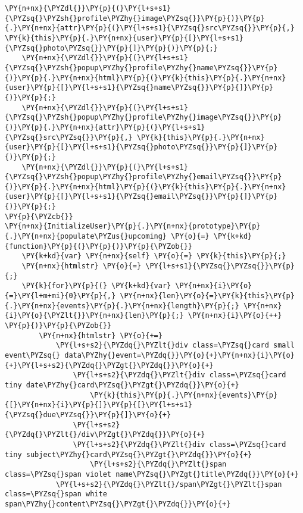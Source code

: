 \begin{Verbatim}[commandchars=\\\{\}]
    \PY{n+nx}{\PYZdl{}}\PY{p}{(}\PY{l+s+s1}{\PYZsq{}\PYZsh{}profile\PYZhy{}image\PYZsq{}}\PY{p}{)}\PY{p}{.}\PY{n+nx}{attr}\PY{p}{(}\PY{l+s+s1}{\PYZsq{}src\PYZsq{}}\PY{p}{,} \PY{k}{this}\PY{p}{.}\PY{n+nx}{user}\PY{p}{[}\PY{l+s+s1}{\PYZsq{}photo\PYZsq{}}\PY{p}{]}\PY{p}{)}\PY{p}{;}
    \PY{n+nx}{\PYZdl{}}\PY{p}{(}\PY{l+s+s1}{\PYZsq{}\PYZsh{}popup\PYZhy{}profile\PYZhy{}name\PYZsq{}}\PY{p}{)}\PY{p}{.}\PY{n+nx}{html}\PY{p}{(}\PY{k}{this}\PY{p}{.}\PY{n+nx}{user}\PY{p}{[}\PY{l+s+s1}{\PYZsq{}name\PYZsq{}}\PY{p}{]}\PY{p}{)}\PY{p}{;}
    \PY{n+nx}{\PYZdl{}}\PY{p}{(}\PY{l+s+s1}{\PYZsq{}\PYZsh{}popup\PYZhy{}profile\PYZhy{}image\PYZsq{}}\PY{p}{)}\PY{p}{.}\PY{n+nx}{attr}\PY{p}{(}\PY{l+s+s1}{\PYZsq{}src\PYZsq{}}\PY{p}{,} \PY{k}{this}\PY{p}{.}\PY{n+nx}{user}\PY{p}{[}\PY{l+s+s1}{\PYZsq{}photo\PYZsq{}}\PY{p}{]}\PY{p}{)}\PY{p}{;}
    \PY{n+nx}{\PYZdl{}}\PY{p}{(}\PY{l+s+s1}{\PYZsq{}\PYZsh{}popup\PYZhy{}profile\PYZhy{}email\PYZsq{}}\PY{p}{)}\PY{p}{.}\PY{n+nx}{html}\PY{p}{(}\PY{k}{this}\PY{p}{.}\PY{n+nx}{user}\PY{p}{[}\PY{l+s+s1}{\PYZsq{}email\PYZsq{}}\PY{p}{]}\PY{p}{)}\PY{p}{;}
\PY{p}{\PYZcb{}}
\PY{n+nx}{InitializeUser}\PY{p}{.}\PY{n+nx}{prototype}\PY{p}{.}\PY{n+nx}{populate\PYZus{}upcoming} \PY{o}{=} \PY{k+kd}{function}\PY{p}{(}\PY{p}{)}\PY{p}{\PYZob{}}
    \PY{k+kd}{var} \PY{n+nx}{self} \PY{o}{=} \PY{k}{this}\PY{p}{;}
    \PY{n+nx}{htmlstr} \PY{o}{=} \PY{l+s+s1}{\PYZsq{}\PYZsq{}}\PY{p}{;}
    \PY{k}{for}\PY{p}{(} \PY{k+kd}{var} \PY{n+nx}{i}\PY{o}{=}\PY{l+m+mi}{0}\PY{p}{,} \PY{n+nx}{len}\PY{o}{=}\PY{k}{this}\PY{p}{.}\PY{n+nx}{events}\PY{p}{.}\PY{n+nx}{length}\PY{p}{;} \PY{n+nx}{i}\PY{o}{\PYZlt{}}\PY{n+nx}{len}\PY{p}{;} \PY{n+nx}{i}\PY{o}{++} \PY{p}{)}\PY{p}{\PYZob{}}
        \PY{n+nx}{htmlstr} \PY{o}{+=}
            \PY{l+s+s2}{\PYZdq{}\PYZlt{}div class=\PYZsq{}card small event\PYZsq{} data\PYZhy{}event=\PYZdq{}}\PY{o}{+}\PY{n+nx}{i}\PY{o}{+}\PY{l+s+s2}{\PYZdq{}\PYZgt{}\PYZdq{}}\PY{o}{+}
                \PY{l+s+s2}{\PYZdq{}\PYZlt{}div class=\PYZsq{}card tiny date\PYZhy{}card\PYZsq{}\PYZgt{}\PYZdq{}}\PY{o}{+}
                    \PY{k}{this}\PY{p}{.}\PY{n+nx}{events}\PY{p}{[}\PY{n+nx}{i}\PY{p}{]}\PY{p}{[}\PY{l+s+s1}{\PYZsq{}due\PYZsq{}}\PY{p}{]}\PY{o}{+}
                \PY{l+s+s2}{\PYZdq{}\PYZlt{}/div\PYZgt{}\PYZdq{}}\PY{o}{+}
                \PY{l+s+s2}{\PYZdq{}\PYZlt{}div class=\PYZsq{}card tiny subject\PYZhy{}card\PYZsq{}\PYZgt{}\PYZdq{}}\PY{o}{+}
                    \PY{l+s+s2}{\PYZdq{}\PYZlt{}span class=\PYZsq{}span violet name\PYZsq{}\PYZgt{}title\PYZdq{}}\PY{o}{+}
            \PY{l+s+s2}{\PYZdq{}\PYZlt{}/span\PYZgt{}\PYZlt{}span class=\PYZsq{}span white span\PYZhy{}content\PYZsq{}\PYZgt{}\PYZdq{}}\PY{o}{+}

\end{Verbatim}
